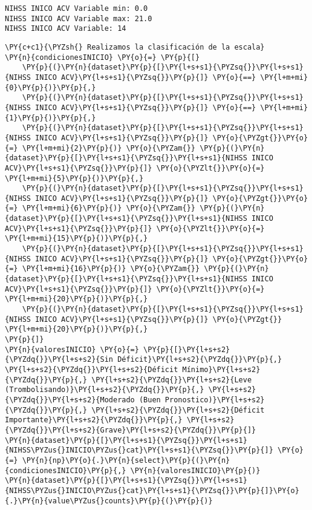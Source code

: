     \begin{Verbatim}[commandchars=\\\{\}]
NIHSS INICO ACV Variable min: 0.0
NIHSS INICO ACV Variable max: 21.0
NIHSS INICO ACV Variable: 14
    \end{Verbatim}

    \begin{tcolorbox}[breakable, size=fbox, boxrule=1pt, pad at break*=1mm,colback=cellbackground, colframe=cellborder]
\begin{Verbatim}[commandchars=\\\{\}]
\PY{c+c1}{\PYZsh{} Realizamos la clasificación de la escala}
\PY{n}{condicionesINICIO} \PY{o}{=} \PY{p}{[}
    \PY{p}{(}\PY{n}{dataset}\PY{p}{[}\PY{l+s+s1}{\PYZsq{}}\PY{l+s+s1}{NIHSS INICO ACV}\PY{l+s+s1}{\PYZsq{}}\PY{p}{]} \PY{o}{==} \PY{l+m+mi}{0}\PY{p}{)}\PY{p}{,}
    \PY{p}{(}\PY{n}{dataset}\PY{p}{[}\PY{l+s+s1}{\PYZsq{}}\PY{l+s+s1}{NIHSS INICO ACV}\PY{l+s+s1}{\PYZsq{}}\PY{p}{]} \PY{o}{==} \PY{l+m+mi}{1}\PY{p}{)}\PY{p}{,}
    \PY{p}{(}\PY{n}{dataset}\PY{p}{[}\PY{l+s+s1}{\PYZsq{}}\PY{l+s+s1}{NIHSS INICO ACV}\PY{l+s+s1}{\PYZsq{}}\PY{p}{]} \PY{o}{\PYZgt{}}\PY{o}{=} \PY{l+m+mi}{2}\PY{p}{)} \PY{o}{\PYZam{}} \PY{p}{(}\PY{n}{dataset}\PY{p}{[}\PY{l+s+s1}{\PYZsq{}}\PY{l+s+s1}{NIHSS INICO ACV}\PY{l+s+s1}{\PYZsq{}}\PY{p}{]} \PY{o}{\PYZlt{}}\PY{o}{=} \PY{l+m+mi}{5}\PY{p}{)}\PY{p}{,}
    \PY{p}{(}\PY{n}{dataset}\PY{p}{[}\PY{l+s+s1}{\PYZsq{}}\PY{l+s+s1}{NIHSS INICO ACV}\PY{l+s+s1}{\PYZsq{}}\PY{p}{]} \PY{o}{\PYZgt{}}\PY{o}{=} \PY{l+m+mi}{6}\PY{p}{)} \PY{o}{\PYZam{}} \PY{p}{(}\PY{n}{dataset}\PY{p}{[}\PY{l+s+s1}{\PYZsq{}}\PY{l+s+s1}{NIHSS INICO ACV}\PY{l+s+s1}{\PYZsq{}}\PY{p}{]} \PY{o}{\PYZlt{}}\PY{o}{=} \PY{l+m+mi}{15}\PY{p}{)}\PY{p}{,}
    \PY{p}{(}\PY{n}{dataset}\PY{p}{[}\PY{l+s+s1}{\PYZsq{}}\PY{l+s+s1}{NIHSS INICO ACV}\PY{l+s+s1}{\PYZsq{}}\PY{p}{]} \PY{o}{\PYZgt{}}\PY{o}{=} \PY{l+m+mi}{16}\PY{p}{)} \PY{o}{\PYZam{}} \PY{p}{(}\PY{n}{dataset}\PY{p}{[}\PY{l+s+s1}{\PYZsq{}}\PY{l+s+s1}{NIHSS INICO ACV}\PY{l+s+s1}{\PYZsq{}}\PY{p}{]} \PY{o}{\PYZlt{}}\PY{o}{=} \PY{l+m+mi}{20}\PY{p}{)}\PY{p}{,}
    \PY{p}{(}\PY{n}{dataset}\PY{p}{[}\PY{l+s+s1}{\PYZsq{}}\PY{l+s+s1}{NIHSS INICO ACV}\PY{l+s+s1}{\PYZsq{}}\PY{p}{]} \PY{o}{\PYZgt{}} \PY{l+m+mi}{20}\PY{p}{)}\PY{p}{,}
\PY{p}{]}
\PY{n}{valoresINICIO} \PY{o}{=} \PY{p}{[}\PY{l+s+s2}{\PYZdq{}}\PY{l+s+s2}{Sin Déficit}\PY{l+s+s2}{\PYZdq{}}\PY{p}{,} \PY{l+s+s2}{\PYZdq{}}\PY{l+s+s2}{Déficit Mínimo}\PY{l+s+s2}{\PYZdq{}}\PY{p}{,} \PY{l+s+s2}{\PYZdq{}}\PY{l+s+s2}{Leve (Trombolisando)}\PY{l+s+s2}{\PYZdq{}}\PY{p}{,} \PY{l+s+s2}{\PYZdq{}}\PY{l+s+s2}{Moderado (Buen Pronostico)}\PY{l+s+s2}{\PYZdq{}}\PY{p}{,} \PY{l+s+s2}{\PYZdq{}}\PY{l+s+s2}{Déficit Importante}\PY{l+s+s2}{\PYZdq{}}\PY{p}{,} \PY{l+s+s2}{\PYZdq{}}\PY{l+s+s2}{Grave}\PY{l+s+s2}{\PYZdq{}}\PY{p}{]}
\PY{n}{dataset}\PY{p}{[}\PY{l+s+s1}{\PYZsq{}}\PY{l+s+s1}{NIHSS\PYZus{}INICIO\PYZus{}cat}\PY{l+s+s1}{\PYZsq{}}\PY{p}{]} \PY{o}{=} \PY{n}{np}\PY{o}{.}\PY{n}{select}\PY{p}{(}\PY{n}{condicionesINICIO}\PY{p}{,} \PY{n}{valoresINICIO}\PY{p}{)}
\PY{n}{dataset}\PY{p}{[}\PY{l+s+s1}{\PYZsq{}}\PY{l+s+s1}{NIHSS\PYZus{}INICIO\PYZus{}cat}\PY{l+s+s1}{\PYZsq{}}\PY{p}{]}\PY{o}{.}\PY{n}{value\PYZus{}counts}\PY{p}{(}\PY{p}{)}
\end{Verbatim}
\end{tcolorbox}

